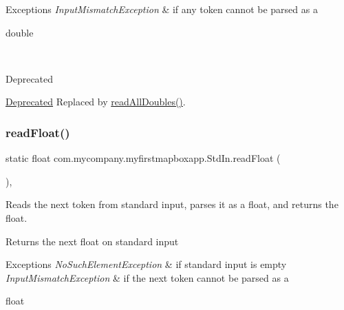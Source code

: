 \begin{DoxyExceptions}{Exceptions}
{\em Input\+Mismatch\+Exception} & if any token cannot be parsed as a
\begin{DoxyCode}
\textcolor{keywordtype}{double} 
\end{DoxyCode}
 \\
\hline
\end{DoxyExceptions}
\begin{DoxyRefDesc}{Deprecated}
\item[\hyperlink{deprecated__deprecated000002}{Deprecated}]Replaced by \hyperlink{classcom_1_1mycompany_1_1myfirstmapboxapp_1_1_std_in_add964ffde2d8786735e76b251407e34c}{read\+All\+Doubles()}. \end{DoxyRefDesc}
\mbox{\label{classcom_1_1mycompany_1_1myfirstmapboxapp_1_1_std_in_abbbb99b032bdedf7eaaef4282b8a33ab}} 
\subsubsection{\texorpdfstring{read\+Float()}{readFloat()}}
{\footnotesize\ttfamily static float com.\+mycompany.\+myfirstmapboxapp.\+Std\+In.\+read\+Float (\begin{DoxyParamCaption}{ }\end{DoxyParamCaption})\hspace{0.3cm}{\ttfamily [inline]}, {\ttfamily [static]}}

Reads the next token from standard input, parses it as a float, and returns the float.

\begin{DoxyReturn}{Returns}
the next float on standard input 
\end{DoxyReturn}

\begin{DoxyExceptions}{Exceptions}
{\em No\+Such\+Element\+Exception} & if standard input is empty \\
\hline
{\em Input\+Mismatch\+Exception} & if the next token cannot be parsed as a
\begin{DoxyCode}
\textcolor{keywordtype}{float} 
\end{DoxyCode}
 \\
\hline
\end{DoxyExceptions}
\mbox{\label{classcom_1_1mycompany_1_1myfirstmapboxapp_1_1_std_in_a5eafdf9c8e8d7e60b99642cb335c9175}} 
